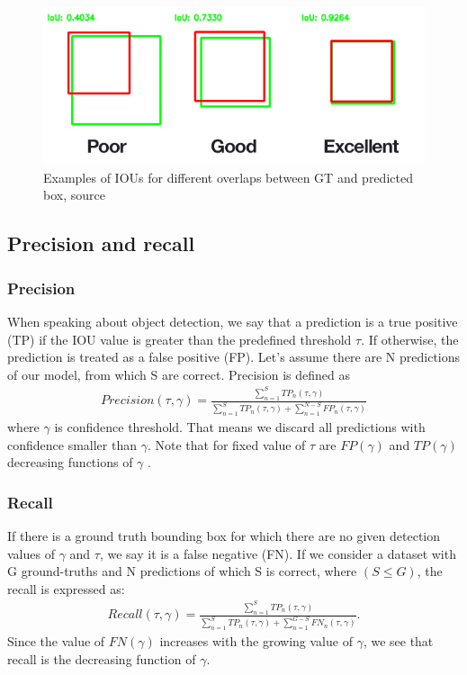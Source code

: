 \begin{figure}
    \includegraphics[width = \linewidth]{images/IOU.jpg}
    \caption{Examples of IOUs for different overlaps between GT and predicted box, source \cite{Cowton2019}}
    \label{fig:iou}
\end{figure}

\subsection{Precision and recall}
\subsubsection{Precision}
\label{subsec:precision}
When speaking about object detection, we say that a prediction is a true positive (TP) if the IOU value is greater than the predefined threshold $\tau$. If otherwise, the prediction is treated as a false positive (FP). Let's assume there are N predictions of our model, from which S are correct. Precision is defined as
\begin{align}
    Precision(\tau, \gamma) = \frac{\sum_{n=1}^S TP_n(\tau, \gamma)}{\sum_{n=1}^S TP_n(\tau, \gamma) + \sum_{n=1}^{N-S} FP_n(\tau, \gamma)}
\end{align}
where $\gamma$ is confidence threshold. That means we discard all predictions with confidence smaller than $\gamma$. Note that for fixed value of $\tau$ are $FP(\gamma)$ and $TP(\gamma)$ decreasing functions of $\gamma$ \cite{Padilla2021}.

\subsubsection{Recall}
\label{subsec:recall}
If there is a ground truth bounding box for which there are no given detection values of $\gamma$ and $\tau$, we say it is a false negative (FN). If we consider a dataset with G ground-truths and N predictions of which S is correct, where $(S \leq G)$, the recall is expressed as:
\begin{align}
    Recall(\tau, \gamma) = \frac{\sum_{n=1}^S TP_n(\tau, \gamma)}{\sum_{n=1}^S TP_n(\tau, \gamma) + \sum_{n=1}^{G-S} FN_n(\tau, \gamma)}.
\end{align}
Since the value of $FN(\gamma)$ increases with the growing value of $\gamma$, we see that recall is the decreasing function of $\gamma$.

